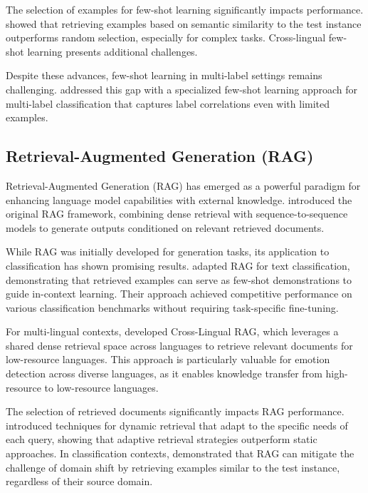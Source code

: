 \documentclass[a4paper,12pt]{extarticle}
\begin{document}
The selection of examples for few-shot learning significantly impacts performance. \cite{liu2022few} showed that retrieving examples based on semantic similarity to the test instance outperforms random selection, especially for complex tasks. Cross-lingual few-shot learning presents additional challenges. 

Despite these advances, few-shot learning in multi-label settings remains challenging. \cite{hou2022few} addressed this gap with a specialized few-shot learning approach for multi-label classification that captures label correlations even with limited examples.

\subsection{Retrieval-Augmented Generation (RAG)}

Retrieval-Augmented Generation (RAG) has emerged as a powerful paradigm for enhancing language model capabilities with external knowledge. \cite{lewis2020retrieval} introduced the original RAG framework, combining dense retrieval with sequence-to-sequence models to generate outputs conditioned on relevant retrieved documents.

While RAG was initially developed for generation tasks, its application to classification has shown promising results. \cite{gao2024retrieval} adapted RAG for text classification, demonstrating that retrieved examples can serve as few-shot demonstrations to guide in-context learning. Their approach achieved competitive performance on various classification benchmarks without requiring task-specific fine-tuning.

For multi-lingual contexts, \cite{shi2023replug} developed Cross-Lingual RAG, which leverages a shared dense retrieval space across languages to retrieve relevant documents for low-resource languages. This approach is particularly valuable for emotion detection across diverse languages, as it enables knowledge transfer from high-resource to low-resource languages.

The selection of retrieved documents significantly impacts RAG performance. \cite{gao2023retrieval} introduced techniques for dynamic retrieval that adapt to the specific needs of each query, showing that adaptive retrieval strategies outperform static approaches. In classification contexts, \cite{singh2022flare} demonstrated that RAG can mitigate the challenge of domain shift by retrieving examples similar to the test instance, regardless of their source domain.
\end{document}
